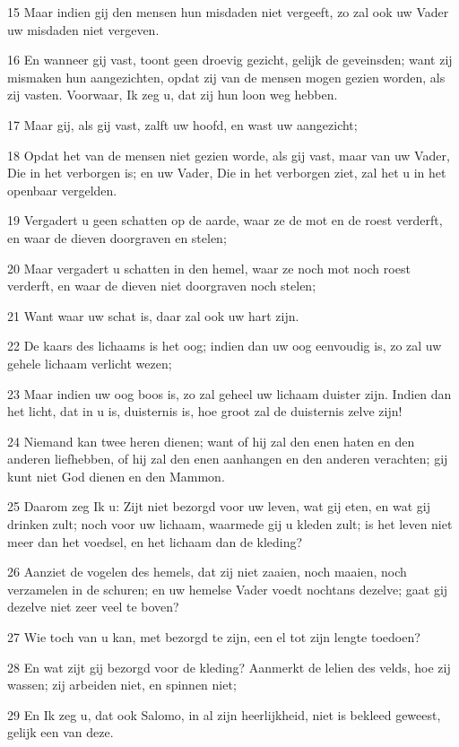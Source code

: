 \par 15 Maar indien gij den mensen hun misdaden niet vergeeft, zo zal ook uw Vader uw misdaden niet vergeven.
\par 16 En wanneer gij vast, toont geen droevig gezicht, gelijk de geveinsden; want zij mismaken hun aangezichten, opdat zij van de mensen mogen gezien worden, als zij vasten. Voorwaar, Ik zeg u, dat zij hun loon weg hebben.
\par 17 Maar gij, als gij vast, zalft uw hoofd, en wast uw aangezicht;
\par 18 Opdat het van de mensen niet gezien worde, als gij vast, maar van uw Vader, Die in het verborgen is; en uw Vader, Die in het verborgen ziet, zal het u in het openbaar vergelden.
\par 19 Vergadert u geen schatten op de aarde, waar ze de mot en de roest verderft, en waar de dieven doorgraven en stelen;
\par 20 Maar vergadert u schatten in den hemel, waar ze noch mot noch roest verderft, en waar de dieven niet doorgraven noch stelen;
\par 21 Want waar uw schat is, daar zal ook uw hart zijn.
\par 22 De kaars des lichaams is het oog; indien dan uw oog eenvoudig is, zo zal uw gehele lichaam verlicht wezen;
\par 23 Maar indien uw oog boos is, zo zal geheel uw lichaam duister zijn. Indien dan het licht, dat in u is, duisternis is, hoe groot zal de duisternis zelve zijn!
\par 24 Niemand kan twee heren dienen; want of hij zal den enen haten en den anderen liefhebben, of hij zal den enen aanhangen en den anderen verachten; gij kunt niet God dienen en den Mammon.
\par 25 Daarom zeg Ik u: Zijt niet bezorgd voor uw leven, wat gij eten, en wat gij drinken zult; noch voor uw lichaam, waarmede gij u kleden zult; is het leven niet meer dan het voedsel, en het lichaam dan de kleding?
\par 26 Aanziet de vogelen des hemels, dat zij niet zaaien, noch maaien, noch verzamelen in de schuren; en uw hemelse Vader voedt nochtans dezelve; gaat gij dezelve niet zeer veel te boven?
\par 27 Wie toch van u kan, met bezorgd te zijn, een el tot zijn lengte toedoen?
\par 28 En wat zijt gij bezorgd voor de kleding? Aanmerkt de lelien des velds, hoe zij wassen; zij arbeiden niet, en spinnen niet;
\par 29 En Ik zeg u, dat ook Salomo, in al zijn heerlijkheid, niet is bekleed geweest, gelijk een van deze.
